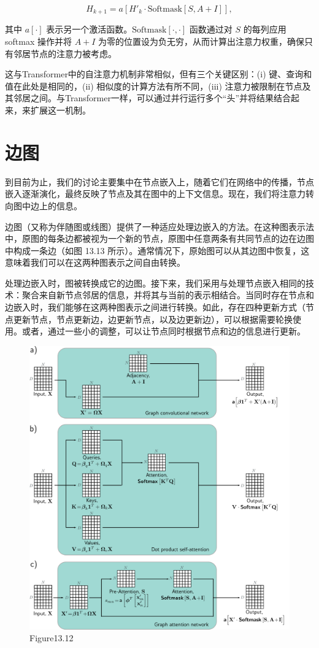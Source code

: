 \[
H_{k+1} = a \left[ H'_k \cdot \text{Softmask}[S, A + I] \right], \tag{13.24}
\]

其中 \(a[\cdot]\) 表示另一个激活函数。\(\text{Softmask}[\cdot,\cdot]\) 函数通过对 \(S\) 的每列应用 softmax 操作并将 \(A + I\) 为零的位置设为负无穷，从而计算出注意力权重，确保只有邻居节点的注意力被考虑。

这与Transformer中的自注意力机制非常相似，但有三个关键区别：(i) 键、查询和值在此处是相同的，(ii) 相似度的计算方法有所不同，(iii) 注意力被限制在节点及其邻居之间。与Transformer一样，可以通过并行运行多个“头”并将结果结合起来，来扩展这一机制。

\section{边图}
到目前为止，我们的讨论主要集中在节点嵌入上，随着它们在网络中的传播，节点嵌入逐渐演化，最终反映了节点及其在图中的上下文信息。现在，我们将注意力转向图中边上的信息。

边图（又称为伴随图或线图）提供了一种适应处理边嵌入的方法。在这种图表示法中，原图的每条边都被视为一个新的节点，原图中任意两条有共同节点的边在边图中构成一条边（如图 13.13 所示）。通常情况下，原始图可以从其边图中恢复，这意味着我们可以在这两种图表示之间自由转换。

处理边嵌入时，图被转换成它的边图。接下来，我们采用与处理节点嵌入相同的技术：聚合来自新节点邻居的信息，并将其与当前的表示相结合。当同时存在节点和边嵌入时，我们能够在这两种图表示之间进行转换。如此，存在四种更新方式（节点更新节点，节点更新边，边更新节点，以及边更新边），可以根据需要轮换使用。或者，通过一些小的调整，可以让节点同时根据节点和边的信息进行更新。

\begin{figure}[ht!]
\centering
\includegraphics[width=0.7\linewidth]{png/chapter13/GraphTransformer.png}
\caption{Figure13.12}
\end{figure}

